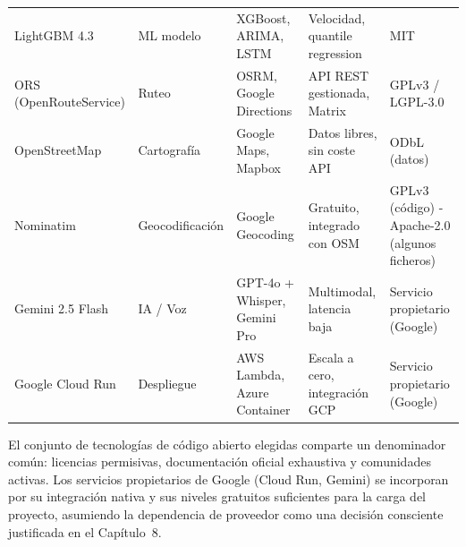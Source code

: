 \begin{table}[H]
\begin{tabularx}{\textwidth}{llXXX}
        LightGBM 4.3           & ML modelo       & XGBoost, ARIMA, LSTM            & Velocidad, quantile regression & MIT                                            \\
        ORS (OpenRouteService) & Ruteo           & OSRM, Google Directions         & API REST gestionada, Matrix    & GPLv3 / LGPL-3.0                               \\
        OpenStreetMap          & Cartografía     & Google Maps, Mapbox             & Datos libres, sin coste API    & ODbL (datos)                                   \\
        Nominatim              & Geocodificación & Google Geocoding                & Gratuito, integrado con OSM    & GPLv3 (código) - Apache-2.0 (algunos ficheros) \\
        Gemini 2.5 Flash       & IA / Voz        & GPT-4o + Whisper, Gemini Pro    & Multimodal, latencia baja      & Servicio propietario (Google)                  \\
        Google Cloud Run       & Despliegue      & AWS Lambda, Azure Container     & Escala a cero, integración GCP & Servicio propietario (Google)                  \\
        \bottomrule
    \end{tabularx}
\end{table}

El conjunto de tecnologías de código abierto elegidas comparte un denominador
común: licencias permisivas, documentación oficial exhaustiva y comunidades
activas. Los servicios propietarios de Google (Cloud Run, Gemini) se incorporan
por su integración nativa y sus niveles gratuitos suficientes para la carga del
proyecto, asumiendo la dependencia de proveedor como una decisión consciente
justificada en el Capítulo~8.